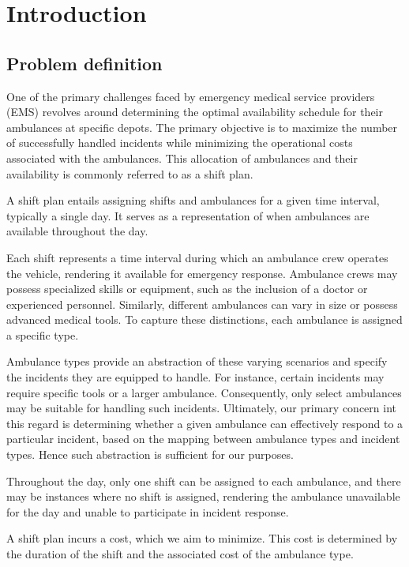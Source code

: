 \setlength{\parindent}{0pt}

\chapter{Introduction}

\section{Problem definition}

One of the primary challenges faced by emergency medical service providers
(EMS) revolves around determining the optimal availability schedule for their
ambulances at specific depots. The primary objective is to maximize the number
of successfully handled incidents while minimizing the operational costs
associated with the ambulances. This allocation of ambulances and their
availability is commonly referred to as a shift plan.

A shift plan entails assigning shifts and ambulances for a given time interval,
typically a single day. It serves as a representation of when ambulances are
available throughout the day.

Each shift represents a time interval during which an ambulance crew operates
the vehicle, rendering it available for emergency response. Ambulance crews may
possess specialized skills or equipment, such as the inclusion of a doctor or
experienced personnel. Similarly, different ambulances can vary in size or
possess advanced medical tools. To capture these distinctions, each ambulance
is assigned a specific type.

Ambulance types provide an abstraction of these varying scenarios and specify
the incidents they are equipped to handle. For instance, certain incidents may
require specific tools or a larger ambulance. Consequently, only select
ambulances may be suitable for handling such incidents. Ultimately, our primary
concern int this regard is determining whether a given ambulance can
effectively respond to a particular incident, based on the mapping between
ambulance types and incident types. Hence such abstraction is sufficient for
our purposes.

Throughout the day, only one shift can be assigned to each ambulance, and there
may be instances where no shift is assigned, rendering the ambulance
unavailable for the day and unable to participate in incident response.

A shift plan incurs a cost, which we aim to minimize. This cost is determined
by the duration of the shift and the associated cost of the ambulance type.

